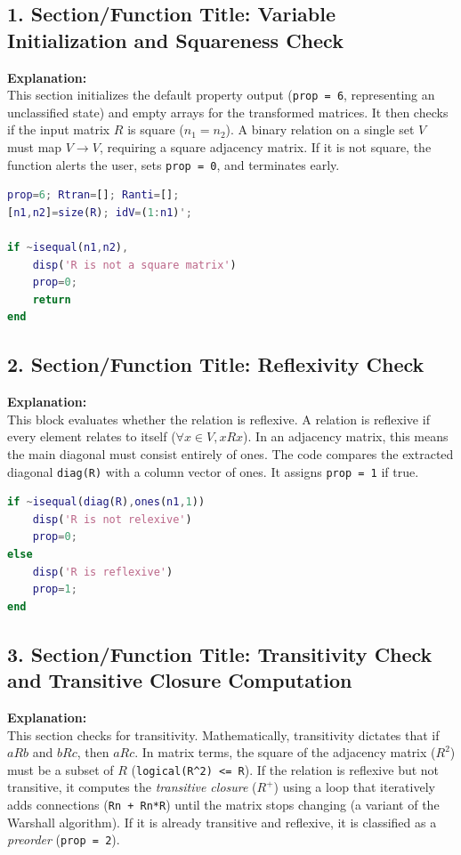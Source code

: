 \subsection{1. Section/Function Title: Variable Initialization and Squareness Check}
\textbf{Explanation:} \\
This section initializes the default property output (\texttt{prop = 6}, representing an unclassified state) and empty arrays for the transformed matrices. It then checks if the input matrix $R$ is square ($n_1 = n_2$). A binary relation on a single set $V$ must map $V \to V$, requiring a square adjacency matrix. If it is not square, the function alerts the user, sets \texttt{prop = 0}, and terminates early.

\begin{lstlisting}[language=Matlab]
prop=6; Rtran=[]; Ranti=[];
[n1,n2]=size(R); idV=(1:n1)'; 

if ~isequal(n1,n2),
    disp('R is not a square matrix')
    prop=0;
    return
end
\end{lstlisting}

\subsection{2. Section/Function Title: Reflexivity Check}
\textbf{Explanation:} \\
This block evaluates whether the relation is reflexive. A relation is reflexive if every element relates to itself ($\forall x \in V, xRx$). In an adjacency matrix, this means the main diagonal must consist entirely of ones. The code compares the extracted diagonal \texttt{diag(R)} with a column vector of ones. It assigns \texttt{prop = 1} if true.

\begin{lstlisting}[language=Matlab]
if ~isequal(diag(R),ones(n1,1))
    disp('R is not relexive')
    prop=0;
else
    disp('R is reflexive')
    prop=1;
end
\end{lstlisting}

\subsection{3. Section/Function Title: Transitivity Check and Transitive Closure Computation}
\textbf{Explanation:} \\
This section checks for transitivity. Mathematically, transitivity dictates that if $aRb$ and $bRc$, then $aRc$. In matrix terms, the square of the adjacency matrix ($R^2$) must be a subset of $R$ (\texttt{logical(R\textasciicircum 2) <= R}). If the relation is reflexive but not transitive, it computes the \textit{transitive closure} ($R^+$) using a loop that iteratively adds connections (\texttt{Rn + Rn*R}) until the matrix stops changing (a variant of the Warshall algorithm). If it is already transitive and reflexive, it is classified as a \textit{preorder} (\texttt{prop = 2}).

